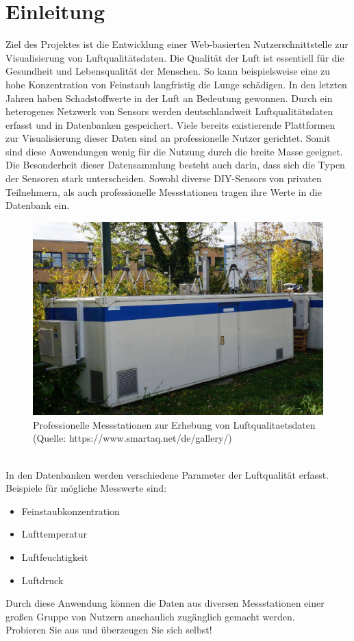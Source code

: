 \section{Einleitung}

Ziel des Projektes ist die Entwicklung einer Web-basierten Nutzerschnittstelle zur Visualisierung von Luftqualitätsdaten.
Die Qualität der Luft ist essentiell für die Gesundheit und Lebensqualität der Menschen. So kann beispielsweise eine zu hohe Konzentration von Feinstaub langfristig die Lunge schädigen. 
In den letzten Jahren haben Schadstoffwerte in der Luft an Bedeutung gewonnen.
Durch ein heterogenes Netzwerk von \glspl{Sensor} werden deutschlandweit Luftqualitätsdaten erfasst und in Datenbanken gespeichert.
Viele bereits existierende Plattformen zur Visualisierung dieser Daten sind an professionelle Nutzer gerichtet. Somit sind diese Anwendungen wenig für die Nutzung durch die breite Masse geeignet.
\\
Die Besonderheit dieser Datensammlung besteht auch darin, dass sich die Typen der Sensoren stark unterscheiden. Sowohl diverse \gls{DIY}-\glspl{Sensor} von privaten Teilnehmern, als auch professionelle Messstationen tragen ihre Werte in die Datenbank ein. 
\\
\begin{figure}[h]
    \centering
    \includegraphics[scale=0.25] {media/Sensor.JPG}
    \caption{Professionelle Messstationen zur Erhebung von \gls{Luftqualitaetsdaten} (Quelle: https://www.smartaq.net/de/gallery/)}
\end{figure}
\\
\clearpage
In den Datenbanken werden verschiedene Parameter der Luftqualität erfasst. Beispiele für mögliche Messwerte sind:
\begin{itemize} [noitemsep]
    \item \gls{Feinstaub}konzentration
    \item Lufttemperatur
    \item Luftfeuchtigkeit
    \item Luftdruck
\end{itemize}
Durch diese Anwendung können die Daten aus diversen Messstationen einer großen Gruppe von Nutzern anschaulich zugänglich gemacht werden.\\
Probieren Sie \softwarename aus und überzeugen Sie sich selbst!